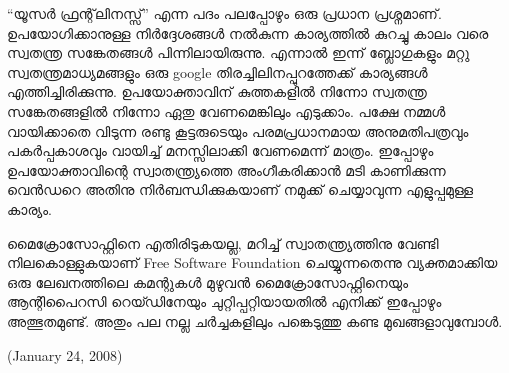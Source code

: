 ``യൂസര്‍ ഫ്രന്റ്‌ലിനസ്സ്'' എന്ന പദം പലപ്പോഴും ഒരു പ്രധാന പ്രശ്നമാണ്. ഉപയോഗിക്കാനുള്ള നിര്‍‌ദ്ദേശങ്ങള്‍ നല്‍കുന്ന കാര്യത്തില്‍ 
കുറച്ചു കാലം വരെ സ്വതന്ത്ര സങ്കേതങ്ങള്‍ പിന്നിലായിരുന്നു. എന്നാല്‍ ഇന്ന് ബ്ലോഗുകളും മറ്റു സ്വതന്ത്രമാധ്യമങ്ങളും ഒരു google 
തിരച്ചിലിനപ്പുറത്തേക്ക് കാര്യങ്ങള്‍ എത്തിച്ചിരിക്കുന്നു. ഉപയോക്താവിന് കുത്തകളില്‍ നിന്നോ സ്വതന്ത്ര സങ്കേതങ്ങളില്‍ നിന്നോ 
ഏതു വേണമെങ്കിലും എടുക്കാം. പക്ഷേ നമ്മള്‍ വായിക്കാതെ വിടുന്ന രണ്ടു കൂട്ടരുടെയും പരമപ്രധാനമായ അനുമതിപത്രവും 
പകര്‍പ്പകാശവും വായിച്ച് മനസ്സിലാക്കി വേണമെന്ന് മാത്രം. ഇപ്പോഴും ഉപയോക്താവിന്റെ സ്വാതന്ത്ര്യത്തെ അംഗീകരിക്കാന്‍ മടി 
കാണിക്കുന്ന വെന്‍ഡറെ അതിനു നിര്‍ബന്ധിക്കുകയാണ് നമുക്ക് ചെയ്യാവുന്ന എളുപ്പമുള്ള കാര്യം.

മൈക്രോസോഫ്റ്റിനെ എതിരിടുകയല്ല, മറിച്ച് സ്വാതന്ത്ര്യത്തിനു വേണ്ടി നിലകൊള്ളുകയാണ് Free Software Foundation 
ചെയ്യുന്നതെന്നു വ്യക്തമാക്കിയ ഒരു ലേഖനത്തിലെ കമന്റുകള്‍ മുഴുവന്‍ മൈക്രോസോഫ്റ്റിനെയും ആന്റിപൈറസി റെയ്ഡിനേയും 
ചുറ്റിപ്പറ്റിയായതില്‍ എനിക്ക് ഇപ്പോഴും അത്ഭുതമുണ്ട്. അതും പല നല്ല ചര്‍ച്ചകളിലും പങ്കെടുത്തു കണ്ട മുഖങ്ങളാവുമ്പോള്‍.


(January 24, 2008)
\newpage
